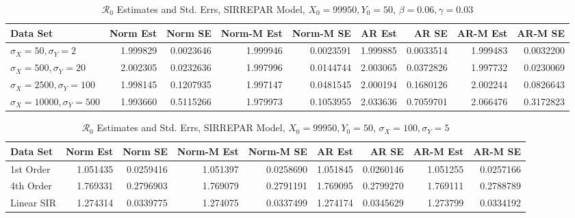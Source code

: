 \message{ !name(draft_v13.tex)}\documentclass[12pt]{article}
\newcommand{\rr}{\ensuremath{\mathcal{R}_0}}
\begin{document}
\begin{table}[H]
	
	\caption{\label{tab:}$\rr$ Estimates and Std. Errs, SIRREPAR Model,
		$X_0 = 99950, Y_0 = 50$, $\beta = 0.06, \gamma = 0.03$}
	\centering
	\begin{footnotesize}
		\begin{tabular}[t]{l|r|r|r|r|r|r|r|r}
			\hline
			Data Set & Norm Est & Norm SE & Norm-M Est & Norm-M SE & AR Est & AR SE & AR-M Est & AR-M SE\\
			\hline
			$\sigma_X = 50, \sigma_Y = 2$ & 1.999829 & 0.0023646 & 1.999946 & 0.0023591 & 1.999885 & 0.0033514 & 1.999483 & 0.0032200\\
			\hline
			$\sigma_X = 500, \sigma_Y = 20$ & 2.002305 & 0.0232636 & 1.997996 & 0.0144744 & 2.003065 & 0.0372826 & 1.997732 & 0.0230069\\
			\hline
			$\sigma_X = 2500, \sigma_Y = 100$ & 1.998145 & 0.1207935 & 1.997147 & 0.0481545 & 2.000194 & 0.1680126 & 2.002244 & 0.0826643\\
			\hline
			$\sigma_X = 10000, \sigma_Y = 500$ & 1.993660 & 0.5115266 & 1.979973 & 0.1053955 & 2.033636 & 0.7059701 & 2.066476 & 0.3172823\\
			\hline
		\end{tabular}
	\end{footnotesize}
\end{table}

\begin{table}[H]
	
	\caption{\label{tab:}$\rr$ Estimates and Std. Errs, SIRREPAR Model,
		$X_0 = 99950, Y_0 = 50$, $\sigma_X = 100, \sigma_Y = 5$}
	\centering
	\begin{footnotesize}
		\begin{tabular}[t]{l|r|r|r|r|r|r|r|r}
			\hline
			Data Set & Norm Est & Norm SE & Norm-M Est & Norm-M SE & AR Est & AR SE & AR-M Est & AR-M SE\\
			\hline
			1st Order & 1.051435 & 0.0259416 & 1.051397 & 0.0258690 & 1.051845 & 0.0260146 & 1.051255 & 0.0257166\\
			\hline
			4th Order & 1.769331 & 0.2796903 & 1.769079 & 0.2791191 & 1.769095 & 0.2799270 & 1.769111 & 0.2788789\\
			\hline
			Linear SIR & 1.274314 & 0.0339775 & 1.274075 & 0.0337499 & 1.274174 & 0.0345629 & 1.273799 & 0.0334192\\
			\hline
		\end{tabular}
	\end{footnotesize}
\end{table}
\end{document}
